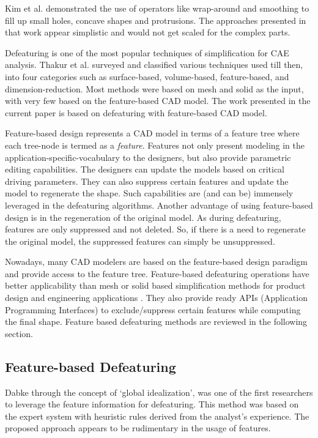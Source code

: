 	Kim et al. \cite{Kim2005} demonstrated the use of operators like wrap-around and smoothing to fill up small holes, concave shapes and protrusions. The approaches presented in that work appear simplistic and would not get scaled for the complex parts.
	
	Defeaturing is one of the most popular techniques of simplification for CAE analysis. Thakur et al. \cite{Thakur2009}surveyed and classified various techniques used till then, into four categories such as surface-based, volume-based, feature-based, and dimension-reduction.  Most methods were based on mesh and solid as the input, with very few based on the feature-based CAD model. The work presented in the current paper is based on defeaturing with feature-based CAD model.

Feature-based design represents a CAD model in terms of a feature tree where each tree-node is termed as a {\em feature}.  Features not only present modeling in the application-specific-vocabulary to the designers, but also provide parametric editing capabilities. The designers can update the models based on critical driving parameters. They can also suppress certain features and update the model to regenerate the shape. Such capabilities are (and can be) immensely leveraged in the defeaturing algorithms. Another advantage of using feature-based design is in the regeneration of the original model. As during defeaturing, features are only suppressed and not deleted. So, if there is a need to regenerate the original model, the suppressed features can simply be unsuppressed.

Nowadays, many CAD modelers are based on the feature-based design paradigm and provide access to the feature tree. Feature-based defeaturing operations have better applicability than mesh or solid based simplification methods for product design and engineering applications  \cite{Kang2013}. They also provide ready APIs (Application Programming Interfaces) to exclude/suppress certain features while computing the final shape. Feature based defeaturing methods are reviewed in the following section.

\subsection{Feature-based Defeaturing}

Dabke \cite{Dabke1994} through the concept of ‘global idealization’, was one of the first researchers to leverage the feature information for defeaturing. This method was based on the expert system with heuristic rules derived from the analyst's experience. The proposed approach appears to be rudimentary in the usage of features.


